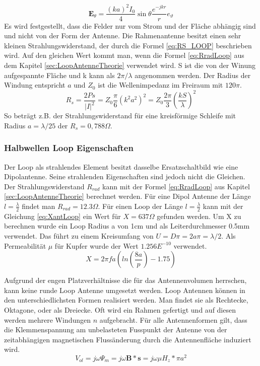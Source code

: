 \begin{equation}
\textbf{E}_{\theta}=\dfrac{(ka)^2I_{0}}{4}\sin \theta \dfrac{e^{-jkr}}{r} e_{\vartheta}
\end{equation}
Es wird festgestellt, dass die Felder nur vom Strom und der Fläche abhängig sind
und nicht von der Form der Antenne. 
Die Rahmenantenne besitzt einen sehr kleinen Strahlungswiderstand, der durch die
Formel \ref{eq:RS_LOOP} beschrieben wird. Auf den gleichen Wert kommt man, wenn die Formel \ref{eq:RradLoop} aus dem Kapitel \ref{sec:LoopAntenneTheorie} verwendet wird. S ist die von der Winung aufgespannte Fläche und k kann als $2\pi/\lambda$ angenommen werden. Der Radius der Windung entspricht $a$ und $Z_0$ ist die Wellenimpedanz im Freiraum mit $120\pi$.
\begin{equation}\label{eq:RS_LOOP}
R_{s}=\dfrac{2Ps}{|I|^{2}}=Z_{0}\dfrac{\pi}{6}(k^{2}a^{2})^{2}=Z_{0}\dfrac{2\pi}{3}\left(\dfrac{kS}{\lambda}\right)^{2} 
\end{equation}
So beträgt z.B. der Strahlungswiderstand für eine kreisförmige Schleife mit Radius $a = \lambda/25$ der  $R_{s} = 0,788\Omega$.


\subsubsection{Halbwellen Loop Eigenschaften}
Der Loop als strahlendes Element besitzt dasselbe Ersatzschaltbild wie eine Dipolantenne. Seine strahlenden Eigenschaften sind jedoch nicht die Gleichen. Der Strahlungswiderstand $R_{rad}$ kann mit der Formel \ref{eq:RradLoop} aus Kapitel \ref{sec:LoopAntenneTheorie} berechnet werden. Für eine Dipol Antenne der Länge $l=\frac{\lambda}{2}$ findet man $R_{rad} = 12.3\Omega$. Für einen Loop der Länge $l=\frac{\lambda}{2}$ kann mit der Gleichung \ref{eq:XantLoop} ein Wert für $X = 637 \Omega$ gefunden werden. Um X zu berechnen wurde ein Loop Radius a von 1cm und als Leiterdurchmesser 0.5mm verwendet. Das führt zu einem Kreisumfang von $U=D\pi=2a\pi=\lambda /2$. Als Permeabilität $\mu $ für Kupfer wurde der Wert $1.256E^{-10}$ verwendet.
\begin{equation}\label{eq:XantLoop}
X= 2\pi f a(ln \left( \frac{8a}{p} \right) - 1.75)
\end{equation}

Aufgrund der engen Platzverhältnisse die für das Antennenvolumen herrschen, kann keine runde Loop Antenne umgesetzt werden. Loop Antennen können in den unterschiedlichsten Formen realisiert werden. Man findet sie als Rechtecke, Oktagone, oder als Dreiecke. Oft wird ein Rahmen gefertigt und auf diesen  werden mehrere Windungen $n$ aufgebracht. Für alle Antennenformen gilt, dass die Klemmenspannung am unbelasteten Fusspunkt der Antenne von der zeitabhängigen magnetischen Flussänderung durch die Antennenfläche induziert wird.
\begin{equation}\label{eq:InduktionspannungLoop}
V_{ol}= j\omega\Psi_{m}=j\omega\textbf{B}*\textbf{s}= j\omega\mu H_{z}*\pi a^{2}
\end{equation}


